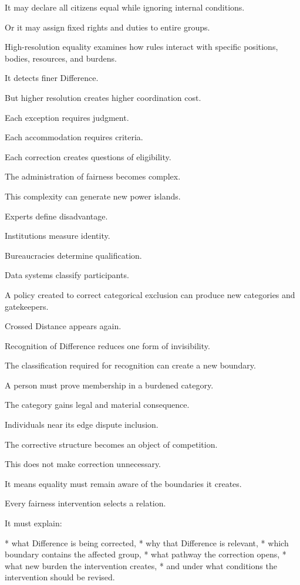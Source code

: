 It may declare all citizens equal while ignoring internal conditions.

Or it may assign fixed rights and duties to entire groups.

High-resolution equality examines how rules interact with specific positions, bodies, resources, and burdens.

It detects finer Difference.

But higher resolution creates higher coordination cost.

Each exception requires judgment.

Each accommodation requires criteria.

Each correction creates questions of eligibility.

The administration of fairness becomes complex.

This complexity can generate new power islands.

Experts define disadvantage.

Institutions measure identity.

Bureaucracies determine qualification.

Data systems classify participants.

A policy created to correct categorical exclusion can produce new categories and gatekeepers.

Crossed Distance appears again.

Recognition of Difference reduces one form of invisibility.

The classification required for recognition can create a new boundary.

A person must prove membership in a burdened category.

The category gains legal and material consequence.

Individuals near its edge dispute inclusion.

The corrective structure becomes an object of competition.

This does not make correction unnecessary.

It means equality must remain aware of the boundaries it creates.

Every fairness intervention selects a relation.

It must explain:

* what Difference is being corrected,
* why that Difference is relevant,
* which boundary contains the affected group,
* what pathway the correction opens,
* what new burden the intervention creates,
* and under what conditions the intervention should be revised.

